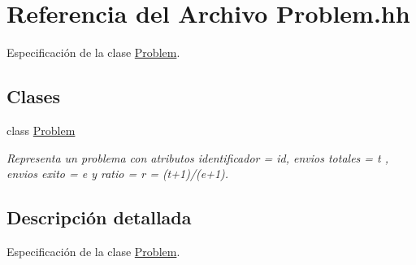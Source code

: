 \hypertarget{_problem_8hh}{}\section{Referencia del Archivo Problem.\+hh}
\label{_problem_8hh}


Especificación de la clase \mbox{\hyperlink{class_problem}{Problem}}.  


\subsection*{Clases}
\begin{DoxyCompactItemize}
\item 
class \mbox{\hyperlink{class_problem}{Problem}}
\begin{DoxyCompactList}\small\item\em Representa un problema con atributos identificador = id, envios totales = t , envios exito = e y ratio = r = (t+1)/(e+1). \end{DoxyCompactList}\end{DoxyCompactItemize}


\subsection{Descripción detallada}
Especificación de la clase \mbox{\hyperlink{class_problem}{Problem}}. 

